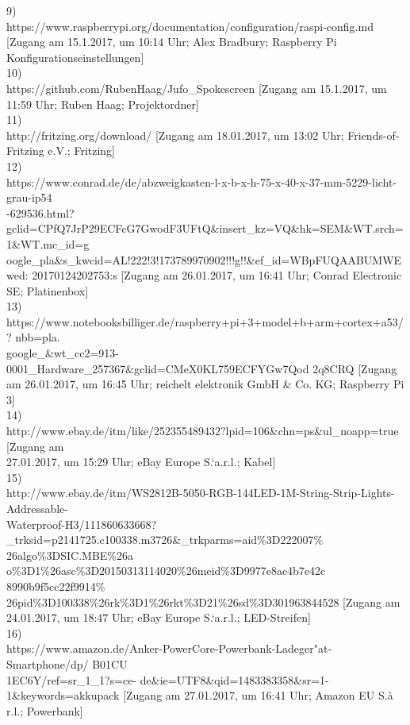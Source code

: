 \documentclass [a4paper, 11pt] {article}
\begin{document}
9)\\
https://www.raspberrypi.org/documentation/configuration/raspi-config.md [Zugang am 15.1.2017, um 10:14 Uhr; Alex Bradbury; Raspberry Pi Konfigurationseinstellungen]\\
10)\\
https://github.com/RubenHaag/Jufo\_Spokescreen [Zugang am 15.1.2017, um 11:59 Uhr; Ruben Haag; Projektordner]\\
11)\\
http://fritzing.org/download/ [Zugang am 18.01.2017, um 13:02 Uhr; Friends-of-Fritzing e.V.; Fritzing]\\
12)\\
https://www.conrad.de/de/abzweigkasten-l-x-b-x-h-75-x-40-x-37-mm-5229-licht-grau-ip54\\-629536.html? gclid=CPfQ7JrP29ECFcG7GwodF3UFtQ\&insert\_kz=VQ\&hk=SEM\&WT.srch=\\1\&WT.mc\_id=g oogle\_pla\&s\_kwcid=AL!222!3!173789970902!!!g!!\&ef\_id=WBpFUQAABUMWE\\wed: 20170124202753:s [Zugang am 26.01.2017, um 16:41 Uhr; Conrad Electronic SE; Platinenbox]\\
13)\\
https://www.notebooksbilliger.de/raspberry+pi+3+model+b+arm+cortex+a53/? nbb=pla.\\google\_\&wt\_cc2=913-0001\_Hardware\_257367\&gclid=CMeX0KL759ECFYGw7Qod 2q8CRQ [Zugang am 26.01.2017, um 16:45 Uhr; reichelt elektronik GmbH \& Co. KG; Raspberry Pi 3]\\
14)\\
http://www.ebay.de/itm/like/252355489432?lpid=106\&chn=ps\&ul\_noapp=true [Zugang am\\ 27.01.2017, um 15:29 Uhr; eBay Europe S.`a.r.l.; Kabel]\\
15)\\
http://www.ebay.de/itm/WS2812B-5050-RGB-144LED-1M-String-Strip-Lights-Addressable-\\ Waterproof-H3/111860633668? \_trksid=p2141725.c100338.m3726\&\_trkparms=aid\%3D222007\%\\26algo\%3DSIC.MBE\%26a o\%3D1\%26asc\%3D20150313114020\%26meid\%3D9977e8ae4b7e42c\\8990b9f5cc22f9914\% 26pid\%3D100338\%26rk\%3D1\%26rkt\%3D21\%26sd\%3D301963844528 [Zugang am 24.01.2017, um 18:47 Uhr; eBay Europe S.`a.r.l.; LED-Streifen]\\
16)\\
https://www.amazon.de/Anker-PowerCore-Powerbank-Ladeger"at-Smartphone/dp/ B01CU\\1EC6Y/ref=sr\_1\_1?s=ce- de\&ie=UTF8\&qid=1483383358\&sr=1-1\&keywords=akkupack [Zugang am 27.01.2017, um 16:41 Uhr; Amazon EU S.\`a r.l.; Powerbank]\\
\end{document}
